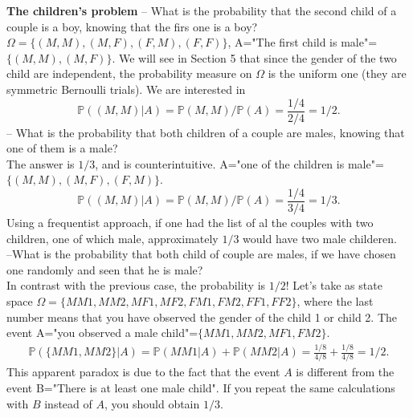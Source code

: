 \documentclass[reqno]{amsart}
\newcommand{\<}{{\langle \!\! \langle}}
\renewcommand{\>}{{\rangle \!\! \rangle}}
\newcommand{\bel}[2]{\begin{equation} \label{#1} \begin{split} #2
 					\end{split} \end{equation}}
\begin{document}
\textbf{The children's problem} 
-- What is the probability that the second child of a couple is a boy, knowing that the firs one is a boy?\\
$\Omega=\{(M,M),(M,F),(F,M),(F,F)\}$,
A="The first child is male"=$\{(M,M),(M,F)\}.  $ We will see in Section 5 that since the gender of the two child are independent, the probability measure on $\Omega$ is the uniform one (they are symmetric Bernoulli trials). We are interested in $$\mathbb{P}((M,M)|A)=\mathbb{P}(M,M)/\mathbb{P}(A)=\frac{1/4}{2/4}=1/2.$$
-- What is the probability that both children of a couple are males, knowing that one of them is a male?\\
The answer is $1/3$, and is counterintuitive. A="one of the children is male"=$\{(M,M),(M,F),(F,M)\}$. 
$$\mathbb{P}((M,M)|A)=\mathbb{P}(M,M)/\mathbb{P}(A)=\frac{1/4}{3/4}=1/3.$$
Using a frequentist approach, if one had the list of al the couples with two children, one of which male, approximately $1/3$ would have two male childeren.\\  
 --What is the probability that both child of couple are males, if we have chosen one randomly and seen that he is male?  \\
In contrast with the previous case, the probability is $1/2$! 
Let's take as state space $\Omega=\{MM1,MM2,MF1,MF2,FM1,FM2,FF1,FF2\}$, where the last number means that you have observed the gender of the child 1 or child 2. The event A="you observed a male child"=$\{MM1,MM2,MF1,FM2\}$.
\bel{}{
\mathbb{P}(\{MM1,MM2\}|A)=\mathbb{P}(MM1|A)+\mathbb{P}(MM2|A)=\frac{1/8}{4/8}+\frac{1/8}{4/8}=1/2.}
This apparent paradox is due to the fact that the event $A$ is different from the event B="There is at least one male child". If you repeat the same calculations with $B$ instead of $A$, you should obtain $1/3$. 
\end{document}
